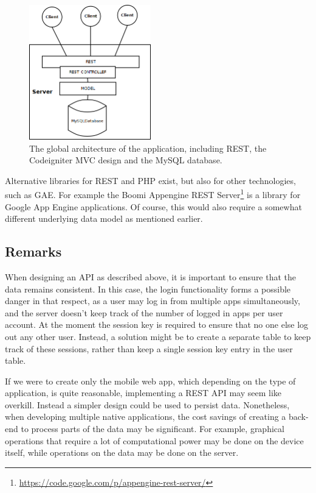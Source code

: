 \begin{figure}
	\begin{center}
		\includegraphics[width=200px]{img/architecture_global2}
		\caption{The global architecture of the application, including REST, the Codeigniter MVC design and the MySQL database.}
		\label{figure:architecture:global2}
	\end{center}
\end{figure}

Alternative libraries for REST and PHP exist, but also for other technologies, such as GAE. For example the Boomi Appengine REST Server\footnote{\url{https://code.google.com/p/appengine-rest-server/}} is a library for Google App Engine applications. Of course, this would also require a somewhat different underlying data model as mentioned earlier.

\subsection{Remarks}

When designing an API as described above, it is important to ensure that the data remains consistent. In this case, the login functionality forms a possible danger in that respect, as a user may log in from multiple apps simultaneously, and the server doesn't keep track of the number of logged in apps per user account. At the moment the session key is required to ensure that no one else log out any other user. Instead, a solution might be to create a separate table to keep track of these sessions, rather than keep a single session key entry in the user table.

If we were to create only the mobile web app, which depending on the type of application, is quite reasonable, implementing a REST API may seem like overkill. Instead a simpler design could be used to persist data. Nonetheless, when developing multiple native applications, the cost savings of creating a back-end to process parts of the data may be significant. For example, graphical operations that require a lot of computational power may be done on the device itself, while operations on the data may be done on the server.

